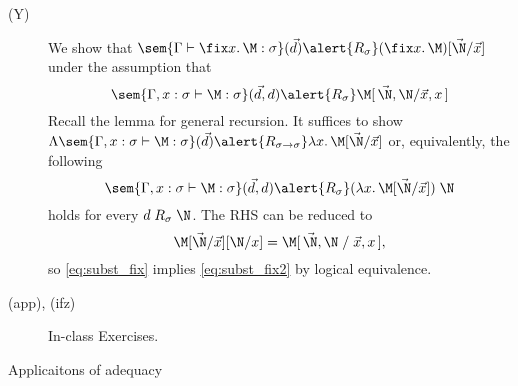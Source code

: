 \begin{frame}
  \begin{description}
    \item[(Y)] We show that
      $\sem{\Gamma \vdash \fix x.\, \M : \sigma}(\vec{d})
        \alert{\mathrel{R_\sigma}}
        (\fix x.\,\M)[\vec{\N}/\vec{x}]$
      under the assumption that
      \begin{equation}
        \label{eq:subst_fix}
        \sem{\Gamma, x : \sigma \vdash \M : \sigma}(\vec{d}, d)
        \alert{\mathrel{R_\sigma}}
        \M[\,\vec{\N}, \N/\vec{x}, x\,]
      \end{equation}
      Recall the lemma for general recursion. It suffices to show
      $\Lambda\sem{\Gamma, x : \sigma \vdash \M : \sigma}(\vec{d})
      \alert{\mathrel{R_{\sigma\to\sigma}}}
        \lambda x.\, \M[\vec{\N}/ \vec{x}] $
      or, equivalently, the following
      \begin{equation}
        \label{eq:subst_fix2}
        \sem{\Gamma, x : \sigma \vdash \M : \sigma}(\vec{d}, d)
        \alert{\mathrel{R_{\sigma}}}
        (\lambda x.\, \M[\vec{\N}/\vec{x}])\;\N
      \end{equation}
      holds for every $d \mathrel{R}_\sigma \N$.
      The RHS can be reduced to
      \[
        \M[\vec{\N}/\vec{x}][\N/x]
        = \M[\,\vec{\N}, \N\mathrel{/}\vec{x}, x\,],
      \]
      so \eqref{eq:subst_fix} implies 
      \eqref{eq:subst_fix2} by logical equivalence.
    \item[(app), (ifz)] In-class Exercises. 
  \end{description}
\end{frame}

\begin{frame}{Applicaitons of adequacy}
\end{frame}

